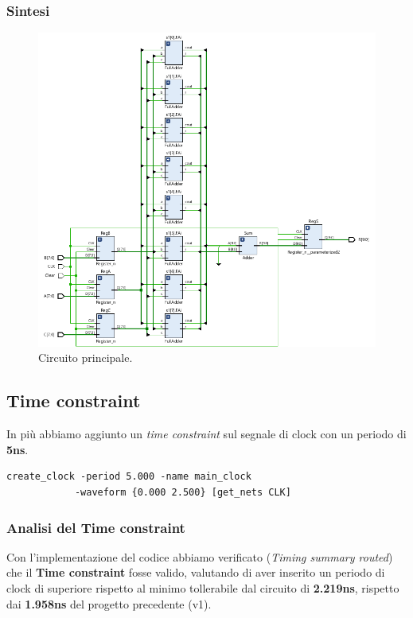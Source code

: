 \documentclass[12pt]{article}
\begin{document}
        \subsubsection{Sintesi}
            \begin{figure}[ht]
                \centering
                \includegraphics[scale=0.8]{main.png}
                \caption{Circuito principale.}
            \end{figure}

    \subsection{Time constraint}
        In più abbiamo aggiunto un \textit{time constraint} sul segnale di clock con un periodo di \textbf{5ns}.

        \begin{lstlisting}[basicstyle=\footnotesize]
            create_clock -period 5.000 -name main_clock
            -waveform {0.000 2.500} [get_nets CLK]
        \end{lstlisting}

        \subsubsection{Analisi del Time constraint}
            Con l'implementazione del codice abbiamo verificato (\textit{Timing summary routed}) che il \textbf{Time constraint} fosse valido, valutando di aver inserito un periodo di clock di superiore rispetto al minimo tollerabile dal circuito di \textbf{2.219ns}, rispetto dai \textbf{1.958ns} del progetto precedente (v1).
\end{document}
